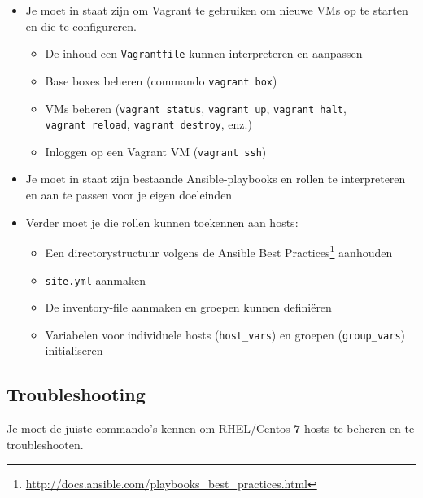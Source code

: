 \begin{itemize}
  \item Je moet in staat zijn om Vagrant te gebruiken om nieuwe VMs op te starten en die te configureren.
  
  \begin{itemize}
    \item De inhoud een \texttt{Vagrantfile} kunnen interpreteren en aanpassen
    \item Base boxes beheren (commando \texttt{vagrant\ box})
    \item VMs beheren (\texttt{vagrant\ status}, \texttt{vagrant\ up}, \texttt{vagrant\ halt}, \texttt{vagrant\ reload}, \texttt{vagrant\ destroy}, enz.)
    \item Inloggen op een Vagrant VM (\texttt{vagrant\ ssh})
  \end{itemize}

  \item Je moet in staat zijn bestaande Ansible-playbooks en rollen te interpreteren en aan te passen voor je eigen doeleinden
  
  \item Verder moet je die rollen kunnen toekennen aan hosts:
  
  \begin{itemize}
    \item Een directorystructuur volgens de Ansible Best Practices\footnote{\url{http://docs.ansible.com/playbooks_best_practices.html}} aanhouden
    \item \texttt{site.yml} aanmaken
    \item De inventory-file aanmaken en groepen kunnen definiëren
    \item Variabelen voor individuele hosts (\texttt{host\_vars}) en groepen (\texttt{group\_vars}) initialiseren
  \end{itemize}
\end{itemize}

\subsection{Troubleshooting}%
\label{ssec:troubleshooting}

Je moet de juiste commando's kennen om RHEL/Centos \textbf{7} hosts te
beheren en te troubleshooten.

